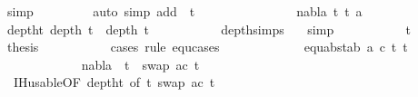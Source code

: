 \begin{isabellebody}
\ simp\isanewline
\ \ \ \ \ \ \ \isamarkupfalse%
\ {\isacharparenleft}{\kern0pt}auto\ simp\ add{\isacharcolon}{\kern0pt}\ {}\ t{}{}{\isacharparenright}{\kern0pt}\isanewline
\ \ \ \ \ \isamarkupfalse%
\isanewline
\ \ \ \ \ \ \ \isamarkupfalse%
\ {\isacharparenleft}{\kern0pt}{}\ nabla\ t{}{\isacharprime}{\kern0pt}\ t{}{\isacharprime}{\kern0pt}\ a{\isacharparenright}{\kern0pt}\isanewline
\ \ \ \ \ \ \ \isamarkupfalse%
\ deptht{}{\isacharcolon}{\kern0pt}\ {\isachardoublequoteopen}depth\ t{}{\isacharprime}{\kern0pt}\ {\isacharless}{\kern0pt}\ depth\ t{}{\isachardoublequoteclose}\isanewline
\ \ \ \ \ \ \ \ \ \isamarkupfalse%
\ depth{\isachardot}{\kern0pt}simps{\isacharparenleft}{\kern0pt}{}{\isacharparenright}{\kern0pt}\ {}{\isacharparenleft}{\kern0pt}{}{\isacharparenright}{\kern0pt}\ \isamarkupfalse%
\ simp\isanewline
\ \ \ \ \ \ \ \ \ \isamarkupfalse%
\ t{}{}\ \isamarkupfalse%
\ {\isacharquery}{\kern0pt}thesis\ \isanewline
\ \ \ \ \ \ \ \ \ \isamarkupfalse%
{\isacharparenleft}{\kern0pt}cases\ rule{\isacharcolon}{\kern0pt}\ equ{\isachardot}{\kern0pt}cases{\isacharparenright}{\kern0pt}\isanewline
\ \ \ \ \ \ \ \ \ \ \ \isamarkupfalse%
\ {\isacharparenleft}{\kern0pt}equ{\isacharunderscore}{\kern0pt}abst{\isacharunderscore}{\kern0pt}ab\ a\ c\ t{}{\isacharprime}{\kern0pt}\ t{}{\isacharprime}{\kern0pt}{\isacharparenright}{\kern0pt}\isanewline
\ \ \ \ \ \ \ \ \ \ \ \isamarkupfalse%
\ {\isachardoublequoteopen}nabla\ {\isasymturnstile}\ t{}{\isacharprime}{\kern0pt}\ {\isasymapprox}\ swap\ {\isacharbrackleft}{\kern0pt}{\isacharparenleft}{\kern0pt}a{\isacharcomma}{\kern0pt}c{\isacharparenright}{\kern0pt}{\isacharbrackright}{\kern0pt}\ t{}{\isacharprime}{\kern0pt}{\isachardoublequoteclose}\isanewline
\ \ \ \ \ \ \ \ \ \ \ \ \ \isamarkupfalse%
\ {}{\isacharparenleft}{\kern0pt}{}{\isacharcomma}{\kern0pt}{}{\isacharcomma}{\kern0pt}{}{\isacharcomma}{\kern0pt}{}{\isacharparenright}{\kern0pt}\ IH{\isacharunderscore}{\kern0pt}usable{\isacharbrackleft}{\kern0pt}OF\ deptht{}{\isacharcomma}{\kern0pt}\ of\ {\isacartoucheopen}t{}{\isacharprime}{\kern0pt}{\isacartoucheclose}\ {\isacartoucheopen}swap\ {\isacharbrackleft}{\kern0pt}{\isacharparenleft}{\kern0pt}a{\isacharcomma}{\kern0pt}c{\isacharparenright}{\kern0pt}{\isacharbrackright}{\kern0pt}\ t{}{\isacharprime}{\kern0pt}{\isacartoucheclose}{\isacharbrackright}{\kern0pt}\ \isanewline

\end{isabellebody}

